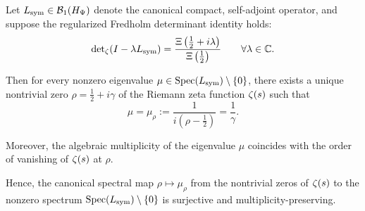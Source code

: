 \begin{lemma}
\label{lem:spectral_exhaustivity}
Let \( L_{\mathrm{sym}} \in \mathcal{B}_1(H_{\Psi}) \) denote the canonical compact, self-adjoint operator, and suppose the regularized Fredholm determinant identity holds:
\[
\det\nolimits_\zeta(I - \lambda L_{\mathrm{sym}}) = \frac{\Xi\left(\tfrac{1}{2} + i\lambda\right)}{\Xi\left(\tfrac{1}{2}\right)} \qquad \forall \lambda \in \mathbb{C}.
\]

Then for every nonzero eigenvalue \( \mu \in \operatorname{Spec}(L_{\mathrm{sym}}) \setminus \{0\} \), there exists a unique nontrivial zero \( \rho = \tfrac{1}{2} + i\gamma \) of the Riemann zeta function \( \zeta(s) \) such that
\[
\mu = \mu_\rho := \frac{1}{i(\rho - \tfrac{1}{2})} = \frac{1}{\gamma}.
\]

Moreover, the algebraic multiplicity of the eigenvalue \( \mu \) coincides with the order of vanishing of \( \zeta(s) \) at \( \rho \).

\medskip
\noindent
Hence, the canonical spectral map \( \rho \mapsto \mu_\rho \) from the nontrivial zeros of \( \zeta(s) \) to the nonzero spectrum \( \operatorname{Spec}(L_{\mathrm{sym}}) \setminus \{0\} \) is surjective and multiplicity-preserving.
\end{lemma}
